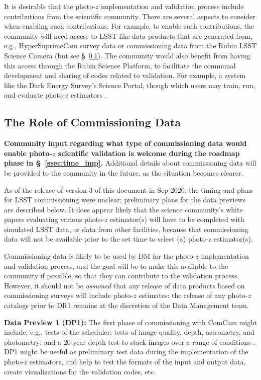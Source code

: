 \documentclass[DM,lsstdraft,toc]{lsstdoc}
\begin{document}
It is desirable that the photo-$z$ implementation and validation process include contributions from the scientific community.
There are several aspects to consider when enabling such contributions.
For example, to enable such contributions, the community will need access to LSST-like data products that are generated from, e.g., HyperSuprimeCam survey data or commissioning data from the Rubin LSST Science Camera (but see \S~\ref{ssec:imp_commissioning}).
The community would also benefit from having this access through the Rubin Science Platform, to facilitate the communal development and sharing of codes related to validation.
For example, a system like the Dark Energy Survey's Science Portal, though which users may train, run, and evaluate photo-$z$ estimators \citet{2018A&C....25...58G}.

\subsection{The Role of Commissioning Data}\label{ssec:imp_commissioning}

{\bf Community input regarding what type of commissioning data would enable photo-$z$ scientific validation is welcome during the roadmap phase in \S~\ref{ssec:time_imp}.} Additional details about commissioning data will be provided to the community in the future, as the situation becomes clearer.

As of the release of version 3 of this document in Sep 2020, the timing and plans for LSST commissioning were unclear; preliminary plans for the data previews are described below.
It does appear likely that the science community's white papers evaluating various photo-$z$ estimator(s) will have to be completed with simulated LSST data, or data from other facilities, because that commissioning data will not be available prior to the set time to select (a) photo-$z$ estimator(s).

Commissioning data is likely to be used by DM for the photo-$z$ implementation and validation process, and the goal will be to make this available to the community if possible, so that they can contribute to the validation process.
However, it should not be {\it assumed} that any release of data products based on commissioning surveys will include photo-$z$ estimates: the release of any photo-$z$ catalogs prior to DR1 remains at the discretion of the Data Management team.

{\bf Data Preview 1 (DP1):} The first phase of commissioning with ComCam might include, e.g., tests of the scheduler; tests of image quality, depth, astrometry, and photometry; and a 20-year depth test to stack images over a range of conditions .
DP1 might be useful as preliminary test data during the implementation of the photo-$z$ estimators, and help to test the formats of the input and output data, create visualizations for the validation codes, etc.
\end{document}
